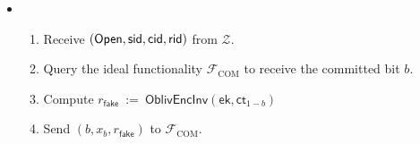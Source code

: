 \documentclass[11pt,letterpaper]{article}
\theoremstyle{plain} %
\theoremstyle{definition} %
\theoremstyle{remark} %
\newcommand{\eqdef}{\ {:=} \ }
\newcommand{\OpenMsg}{\mathsf{Open}}
\newcommand{\Input}{x}
\newcommand{\OblivEncInv}{\mathsf{OblivEncInv}}
\newcommand{\EncKey}{\mathsf{ek}}
\newcommand{\Ct}{\mathsf{ct}}
\newcommand{\Rand}{r}
\newcommand{\Environment}{{\mathcal{Z}}} %
\newcommand{\IF}{\mathcal{F}} %
\newcommand{\sid}{\mathsf{sid}}
\newcommand{\IFCom}{\IF_{\mathrm{COM}}}
\newcommand{\CommBit}{b}
\begin{document}
\begin{itemize}
\item {}
\newcommand{\fake}{\mathsf{fake}}
\begin{enumerate}[nolistsep]
    \item Receive $(\OpenMsg,\sid,\CommitterId,\ReceiverId)$ from $\Environment$.
	\item Query the ideal functionality $\IFCom$ to receive the committed bit $\CommBit$.
    \item Compute $\Rand_{\fake} \eqdef \OblivEncInv(\EncKey, \Ct_{1-\CommBit})$
    \item Send $(\CommBit, \Input_{\CommBit}, \Rand_{\fake})$ to $\IFCom$.
\end{enumerate}

\end{itemize}

\end{document}
